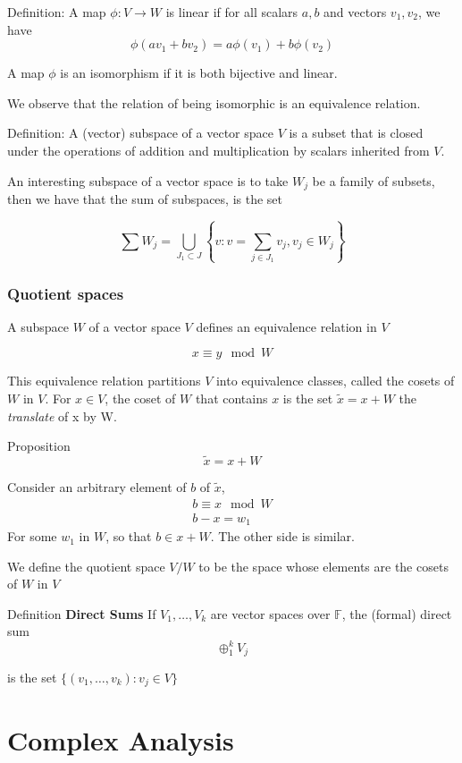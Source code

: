 \documentclass[11pt,twoside]{book}
\begin{document}
Definition: A map $\phi: V \rightarrow W$ is linear if for all scalars $a,b$ and vectors $v_1, v_2$, we have
\begin{equation*}
	\phi(av_1 + b v_2) = a \phi(v_1) + b \phi(v_2)
\end{equation*}

A map $\phi$ is an isomorphism if it is both bijective and linear.

We observe that the relation of being isomorphic is an equivalence relation.

Definition: A (vector) subspace of a vector space $V$ is a subset that is closed under the operations of addition and multiplication by scalars inherited from $V$.
 
An interesting subspace of a vector space is to take $W_j$ be a family of subsets, then we have that the sum of subspaces, is the set

\[
\sum W_j = \bigcup_{J_1 \subset J} \left\lbrace v : v = \sum_{j \in J_1} v_j, v_j \in W_j \right\rbrace 
\]

\subsection{Quotient spaces}

A subspace $W$ of a vector space $V$ defines an equivalence relation in $V$

\[
	x \equiv y  \mod W
\]

This equivalence relation partitions $V$  into equivalence classes, called the cosets of $W$ in $V$. For $ x \in V$, the coset of $W$ that contains $x$ is the set $\tilde{x} = x + W$ the \textit{translate} of x by W.

Proposition 
\[
	\tilde{x} = x + W
\]

Consider an  arbitrary element of $b$ of $ \tilde{x} $,
\begin{align*}
	b \equiv x \mod W \\
	b - x = w_1
\end{align*}
For some $w_1$ in $W$, so that $b \in x + W$. The other side is similar.

We define the quotient space $V/W$ to be the space whose elements are the cosets of $W$ in $V$

Definition \textbf{Direct Sums}
If $V_1, \ldots, V_k$ are vector spaces over $\mathbb{F}$, the (formal) direct sum
\[
	\oplus_1^k V_j 
\]

is the set $ \lbrace (v_1,\ldots,v_k) : v_j \in V \rbrace $


\chapter{Complex Analysis}
\end{document}
